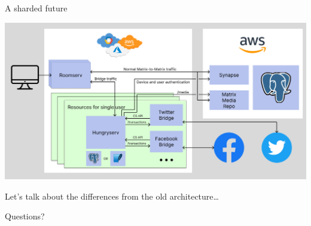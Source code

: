 \documentclass{beeper}
\begin{document}
\begin{frame}{A sharded future}
    \centerline{\includegraphics[width=1.15\textwidth]{images/new-architecture}}

    Let's talk about the differences from the old architecture\ldots
\end{frame}

\begingroup
\def\insertframenumber{\relax}
\begin{frame}[standout]
    \Large
    Questions?
\end{frame}
\endgroup
\end{document}
